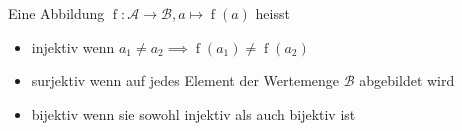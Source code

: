 Eine Abbildung $\operatorname{f} : \mathcal{A} \to \mathcal{B}, a \mapsto \operatorname{f}(a)$ heisst
\begin{itemize}
	\item injektiv wenn $a_1 \neq a_2 \implies \operatorname{f}(a_1) \neq \operatorname{f}(a_2)$ 
	\item surjektiv wenn auf jedes Element der Wertemenge $\mathcal{B}$ abgebildet wird
	\item bijektiv wenn sie sowohl injektiv als auch bijektiv ist
\end{itemize}

